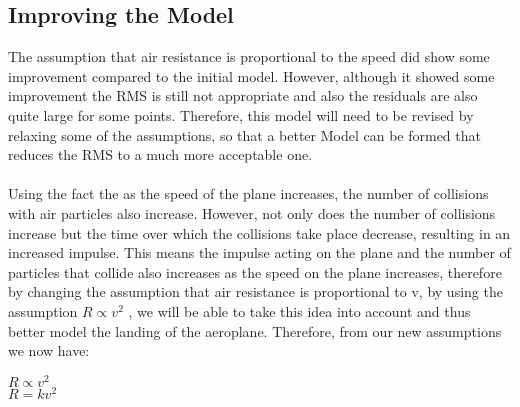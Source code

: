 \subsection{Improving the Model}
The assumption that air resistance is proportional to the speed did show some improvement compared to the initial model. However, although it showed some improvement the RMS is still not appropriate and also the residuals are also quite large for some points. Therefore, this model will need to be revised by relaxing some of the assumptions, so that a better Model can be formed that reduces the RMS to a much more acceptable one.
\\ \\
Using the fact the as the speed of the plane increases, the number of collisions with air particles also increase. However, not only does the number of collisions increase but the time over which the collisions take place decrease, resulting in an increased impulse. This means the impulse acting on the plane and the number of particles that collide also increases as the speed on the plane increases, therefore by changing the assumption that air resistance is proportional to v, by using the assumption $R \propto v^2$ , we will be able to take this idea into account and thus better model the landing of the aeroplane. Therefore, from our new assumptions we now have:

\begin{center}
    $ R \propto v^2 $
    \\$ R = kv^2 $
\end{center}